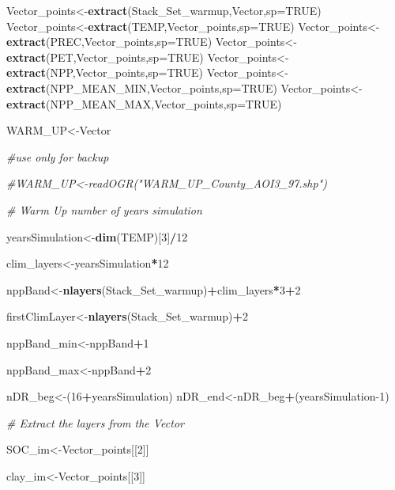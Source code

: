 \documentclass[
  10pt,
  b5paper,
]{book}
\newenvironment{Shaded}{\begin{snugshade}}{\end{snugshade}}
\newcommand{\CommentTok}[1]{\textcolor[rgb]{0.56,0.35,0.01}{\textit{#1}}}
\newcommand{\DataTypeTok}[1]{\textcolor[rgb]{0.13,0.29,0.53}{#1}}
\newcommand{\DecValTok}[1]{\textcolor[rgb]{0.00,0.00,0.81}{#1}}
\newcommand{\KeywordTok}[1]{\textcolor[rgb]{0.13,0.29,0.53}{\textbf{#1}}}
\newcommand{\NormalTok}[1]{#1}
\newcommand{\OperatorTok}[1]{\textcolor[rgb]{0.81,0.36,0.00}{\textbf{#1}}}
\newcommand{\OtherTok}[1]{\textcolor[rgb]{0.56,0.35,0.01}{#1}}
\begin{document}
\begin{Shaded}
\begin{Highlighting}[]
\NormalTok{Vector_points<-}\KeywordTok{extract}\NormalTok{(Stack_Set_warmup,Vector,}\DataTypeTok{sp=}\OtherTok{TRUE}\NormalTok{)}
\NormalTok{Vector_points<-}\KeywordTok{extract}\NormalTok{(TEMP,Vector_points,}\DataTypeTok{sp=}\OtherTok{TRUE}\NormalTok{)}
\NormalTok{Vector_points<-}\KeywordTok{extract}\NormalTok{(PREC,Vector_points,}\DataTypeTok{sp=}\OtherTok{TRUE}\NormalTok{)}
\NormalTok{Vector_points<-}\KeywordTok{extract}\NormalTok{(PET,Vector_points,}\DataTypeTok{sp=}\OtherTok{TRUE}\NormalTok{)}
\NormalTok{Vector_points<-}\KeywordTok{extract}\NormalTok{(NPP,Vector_points,}\DataTypeTok{sp=}\OtherTok{TRUE}\NormalTok{)}
\NormalTok{Vector_points<-}\KeywordTok{extract}\NormalTok{(NPP_MEAN_MIN,Vector_points,}\DataTypeTok{sp=}\OtherTok{TRUE}\NormalTok{)}
\NormalTok{Vector_points<-}\KeywordTok{extract}\NormalTok{(NPP_MEAN_MAX,Vector_points,}\DataTypeTok{sp=}\OtherTok{TRUE}\NormalTok{)}

\NormalTok{WARM_UP<-Vector}

\CommentTok{#use only for backup}

\CommentTok{#WARM_UP<-readOGR("WARM_UP_County_AOI3_97.shp")}

\CommentTok{# Warm Up number of years simulation }

\NormalTok{yearsSimulation<-}\KeywordTok{dim}\NormalTok{(TEMP)[}\DecValTok{3}\NormalTok{]}\OperatorTok{/}\DecValTok{12}

\NormalTok{clim_layers<-yearsSimulation}\OperatorTok{*}\DecValTok{12}

\NormalTok{nppBand<-}\KeywordTok{nlayers}\NormalTok{(Stack_Set_warmup)}\OperatorTok{+}\NormalTok{clim_layers}\OperatorTok{*}\DecValTok{3}\OperatorTok{+}\DecValTok{2}

\NormalTok{firstClimLayer<-}\KeywordTok{nlayers}\NormalTok{(Stack_Set_warmup)}\OperatorTok{+}\DecValTok{2}

\NormalTok{nppBand_min<-nppBand}\OperatorTok{+}\DecValTok{1}

\NormalTok{nppBand_max<-nppBand}\OperatorTok{+}\DecValTok{2}

\NormalTok{nDR_beg<-(}\DecValTok{16}\OperatorTok{+}\NormalTok{yearsSimulation)}
\NormalTok{nDR_end<-nDR_beg}\OperatorTok{+}\NormalTok{(yearsSimulation}\DecValTok{-1}\NormalTok{)}

\CommentTok{# Extract the layers from the Vector}

\NormalTok{SOC_im<-Vector_points[[}\DecValTok{2}\NormalTok{]] }

\NormalTok{clay_im<-Vector_points[[}\DecValTok{3}\NormalTok{]] }


\end{Highlighting}
\end{Shaded}
\end{document}

